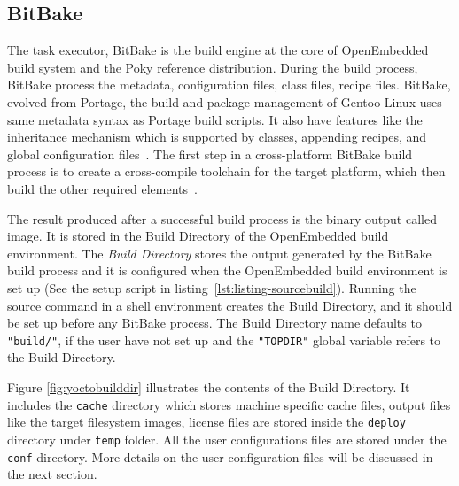 \subsection{BitBake} \label{section:bitbake}
The task executor, BitBake is the build engine at the core of OpenEmbedded build system and the Poky reference distribution. During the build process, BitBake process the metadata, configuration files, class files, recipe files. BitBake, evolved from Portage, the build and package management of Gentoo Linux uses same metadata syntax as Portage build scripts. It also have features like the inheritance mechanism which is supported by classes, appending recipes, and global configuration files~\parencite{Reference1}. The first step in a cross-platform BitBake build process is to create a cross-compile toolchain for the target platform, which then build the other required elements~\parencite{veromannembedded}.


The result produced after a successful build process is the binary output called image. It is stored in the Build Directory of the OpenEmbedded build environment. The \emph{Build Directory} stores the output generated by the BitBake build process and it is configured when the OpenEmbedded build environment is set up (See the setup script in listing~\ref{lst:listing-sourcebuild}). Running the source command in a shell environment creates the Build Directory, and it should be set up before any BitBake process. The Build Directory name defaults to \texttt{"build/"}, if the user have not set up and the \texttt{"TOPDIR"} global variable refers to the Build Directory.

\vspace{0.5cm}
\lstset{style=mystyle}

\vspace{0.5cm}

Figure \ref{fig:yoctobuilddir} illustrates the contents of the Build Directory. It includes the \texttt{cache} directory which stores machine specific cache files, output files like the target filesystem images, license files are stored inside the \texttt{deploy} directory under \texttt{temp} folder. All the user configurations files are stored under the \texttt{conf} directory. More details on the user configuration files will be discussed in the next section.

